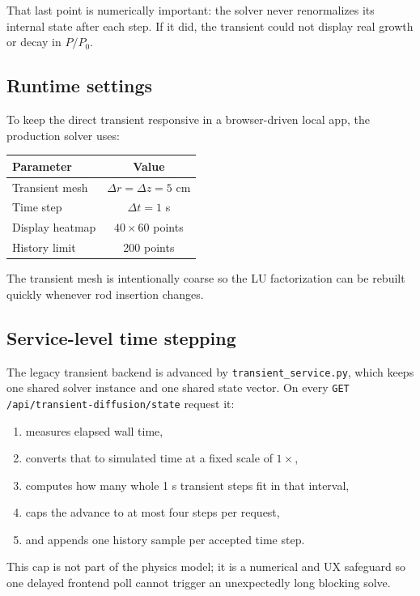 \documentclass[11pt]{article}
\begin{document}
That last point is numerically important: the solver never renormalizes its
internal state after each step.  If it did, the transient could not display real
growth or decay in $P/P_0$.

\subsection{Runtime settings}

To keep the direct transient responsive in a browser-driven local app, the
production solver uses:

\begin{center}
\begin{tabular}{lc}
\toprule
Parameter & Value \\
\midrule
Transient mesh & $\Delta r = \Delta z = 5$ cm \\
Time step & $\Delta t = 1$ s \\
Display heatmap & $40 \times 60$ points \\
History limit & 200 points \\
\bottomrule
\end{tabular}
\end{center}

The transient mesh is intentionally coarse so the LU factorization can be
rebuilt quickly whenever rod insertion changes.

\subsection{Service-level time stepping}

The legacy transient backend is advanced by \texttt{transient\_service.py}, which keeps one
shared solver instance and one shared state vector.  On every
\texttt{GET /api/transient-diffusion/state} request it:
\begin{enumerate}
  \item measures elapsed wall time,
  \item converts that to simulated time at a fixed scale of $1\times$,
  \item computes how many whole 1 s transient steps fit in that interval,
  \item caps the advance to at most four steps per request,
  \item and appends one history sample per accepted time step.
\end{enumerate}

This cap is not part of the physics model; it is a numerical and UX safeguard so
one delayed frontend poll cannot trigger an unexpectedly long blocking solve.
\end{document}
